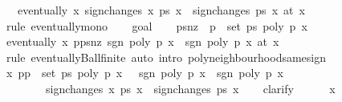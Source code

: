 \begin{isabellebody}
\ \ \ {\isachardoublequoteopen}eventually\ {\isacharparenleft}{\isasymlambda}x{\isachardot}\ sign{\isacharunderscore}changes{\isacharprime}\ x\ ps\ x\ {\isacharequal}\ sign{\isacharunderscore}changes\ ps\ x{\isacharparenright}\ {\isacharparenleft}at\ x\isanewline
%
\isadelimproof
%
\endisadelimproof
%
\isatagproof
{}\isamarkupfalse%
\ {\isacharparenleft}rule\ eventually{\isacharunderscore}mono{\isacharparenright}\isanewline
\ \ \isamarkupfalse%
\ goal{}\isanewline
\ \ \isamarkupfalse%
\ {\isacharquery}ps{\isacharunderscore}nz\ {\isacharequal}\ {\isachardoublequoteopen}{\isacharbraceleft}p\ {\isasymin}\ set\ ps{\isachardot}\ poly\ p\ x\ {\isasymnoteq}\ {}{\isacharbraceright}{\isachardoublequoteclose}\isanewline
\ \ \isamarkupfalse%
\ {\isachardoublequoteopen}eventually\ {\isacharparenleft}{\isasymlambda}x{\isachardot}\ {\isasymforall}p{\isasymin}{\isacharquery}ps{\isacharunderscore}nz{\isachardot}\ sgn\ {\isacharparenleft}poly\ p\ x{\isacharparenright}\ {\isacharequal}\ sgn\ {\isacharparenleft}poly\ p\ x\ {\isacharparenleft}at\ x\isanewline
\ \ \ \ \ \ \isamarkupfalse%
\ {\isacharparenleft}rule\ eventually{\isacharunderscore}Ball{\isacharunderscore}finite{\isacharcomma}\ auto\ intro{\isacharcolon}\ poly{\isacharunderscore}neighbourhood{\isacharunderscore}same{\isacharunderscore}sign{\isacharparenright}\isanewline
\isanewline
\ \ \isamarkupfalse%
\ {\isachardoublequoteopen}{\isasymforall}x{\isachardot}\ {\isacharparenleft}{\isasymforall}p{\isasymin}{\isacharbraceleft}p\ {\isasymin}\ set\ ps{\isachardot}\ poly\ p\ x\ {\isasymnoteq}\ {}{\isacharbraceright}{\isachardot}\ sgn\ {\isacharparenleft}poly\ p\ x{\isacharparenright}\ {\isacharequal}\ sgn\ {\isacharparenleft}poly\ p\ x\ {\isasymlongrightarrow}\isanewline
\ \ \ \ \ \ \ \ sign{\isacharunderscore}changes{\isacharprime}\ x\ ps\ x\ {\isacharequal}\ sign{\isacharunderscore}changes\ ps\ x{\isachardoublequoteclose}\isanewline
\ \ \isamarkupfalse%
\ {\isacharparenleft}clarify{\isacharparenright}\isanewline
\ \ \ \ \isamarkupfalse%
\ x\ \isamarkupfalse%

\end{isabellebody}
